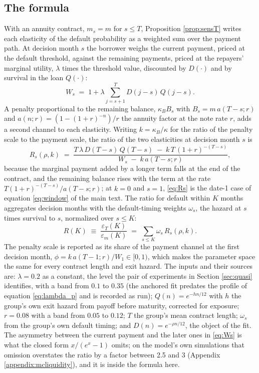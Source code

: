 \subsection{The formula}
With an annuity contract, $m_s = m$ for $s \le T$, Proposition \ref{prop:sensT} writes each elasticity of the default probability as a weighted sum over the payment path. At decision month $s$ the borrower weighs the current payment, priced at the default threshold, against the remaining payments, priced at the repayers' marginal utility, $\lambda$ times the threshold value, discounted by $D(\cdot)$ and by survival in the loan $Q(\cdot)$:
\begin{equation}
W_s \;=\; 1 + \lambda \sum_{j=s+1}^{T} D(j-s)\,Q(j-s).
\label{eq:Ws}
\end{equation}
A penalty proportional to the remaining balance, $\kappa_B B_s$ with $B_s = m\,a(T-s; r)$ and $a(n; r) = (1-(1+r)^{-n})/r$ the annuity factor at the note rate $r$, adds a second channel to each elasticity. Writing $k = \kappa_B/\kappa$ for the ratio of the penalty scale to the payment scale, the ratio of the two elasticities at decision month $s$ is
\begin{equation}
R_s(\rho, k) \;=\; \frac{T\,\lambda\,D(T-s)\,Q(T-s) \;-\; k\,T\,(1+r)^{-(T-s)}}{W_s \;-\; k\,a(T-s; r)},
\label{eq:Rs}
\end{equation}
because the marginal payment added by a longer term falls at the end of the contract, and the remaining balance rises with the term at the rate $T(1+r)^{-(T-s)}/a(T-s;r)$; at $k = 0$ and $s = 1$, \eqref{eq:Rs} is the date-1 case of equation \eqref{eq:window} of the main text. The ratio for default within $K$ months aggregates decision months with the default-timing weights $\omega_s$, the hazard at $s$ times survival to $s$, normalized over $s \le K$:
\begin{equation}
R(K) \;\equiv\; \frac{\varepsilon_T(K)}{\varepsilon_m(K)} \;=\; \sum_{s \le K} \omega_s\, R_s(\rho, k).
\label{eq:RK}
\end{equation}
The penalty scale is reported as its share of the payment channel at the first decision month, $\phi = k\,a(T-1;r)/W_1 \in [0, 1)$, which makes the parameter space the same for every contract length and exit hazard. The inputs and their sources are: $\lambda = 0.2$ as a constant, the level the pair of experiments in Section \ref{sec:quasi} identifies, with a band from $0.1$ to $0.35$ (the anchored fit predates the profile of equation \eqref{eq:lambda_p} and is recorded as run); $Q(n) = e^{-h n/12}$ with $h$ the group's own exit hazard from payoff before maturity, corrected for exposure; $r = 0.08$ with a band from $0.05$ to $0.12$; $T$ the group's mean contract length; $\omega_s$ from the group's own default timing; and $D(n) = e^{-\rho n/12}$, the object of the fit. The asymmetry between the current payment and the later ones in \eqref{eq:Ws} is what the closed form $x/(e^x-1)$ omits; on the model's own simulations that omission overstates the ratio by a factor between 2.5 and 3 (Appendix \ref{appendix:mcliquidity}), and it is inside the formula here.

